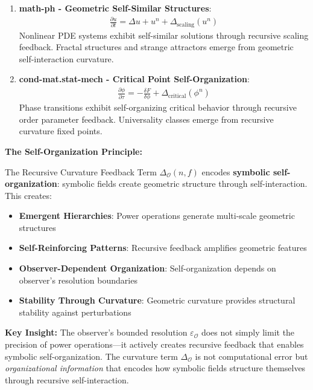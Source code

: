 \begin{scholium}
\begin{enumerate}
\item \textbf{math-ph - Geometric Self-Similar Structures}:
   \begin{align}
   \frac{\partial u}{\partial t} = \Delta u + u^n + \Delta_{\text{scaling}}(u^n)
   \end{align}
   Nonlinear PDE systems exhibit self-similar solutions through recursive scaling feedback. Fractal structures and strange attractors emerge from geometric self-interaction curvature.

\item \textbf{cond-mat.stat-mech - Critical Point Self-Organization}:
   \begin{align}
   \frac{\partial \phi}{\partial \tau} = -\frac{\delta F}{\delta \phi} + \Delta_{\text{critical}}(\phi^n)
   \end{align}
   Phase transitions exhibit self-organizing critical behavior through recursive order parameter feedback. Universality classes emerge from recursive curvature fixed points.
\end{enumerate}
\end{scholium}

\textbf{The Self-Organization Principle:}

The Recursive Curvature Feedback Term $\Delta_{\mathcal{O}}(n, f)$ encodes
\textbf{symbolic self-organization}: symbolic fields create geometric
structure through self-interaction. This creates:

\begin{itemize}
\item \textbf{Emergent Hierarchies}: Power operations generate multi-scale geometric structures
\item \textbf{Self-Reinforcing Patterns}: Recursive feedback amplifies geometric features
\item \textbf{Observer-Dependent Organization}: Self-organization depends on observer's resolution boundaries
\item \textbf{Stability Through Curvature}: Geometric curvature provides structural stability against perturbations
\end{itemize}

\textbf{Key Insight:} The observer's bounded resolution $\varepsilon_{\mathcal{O}}$ does not simply limit the precision of power operations---it actively creates recursive feedback that enables symbolic self-organization. The curvature term $\Delta_{\mathcal{O}}$ is not computational error but \textit{organizational information} that encodes how symbolic fields structure themselves through recursive self-interaction.

